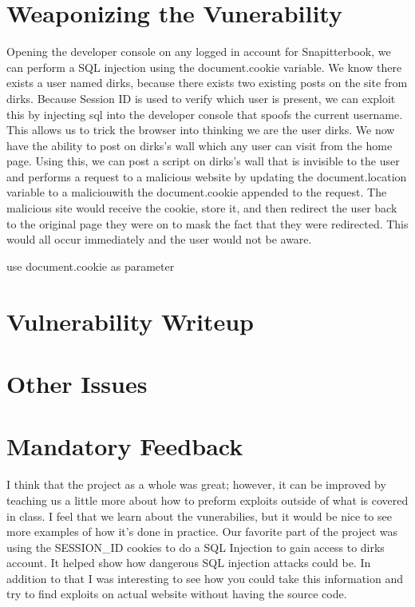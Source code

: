\documentclass[12pt]{article}
\begin{document}
\maketitle

\section{Weaponizing the Vunerability}
Opening the developer console on any logged in account for Snapitterbook, we can perform a SQL injection using the document.cookie variable.  We know there exists a user named dirks, because there exists two existing posts on the site from dirks.  Because Session ID is used to verify which user is present, we can exploit this by injecting sql into the developer console that spoofs the current username.  This allows us to trick the browser into thinking we are the user dirks.  We now have the ability to post on dirks's wall which any user can visit from the home page.  Using this, we can post a script on dirks's wall that is invisible to the user and performs a request to a malicious website by updating the document.location variable to a maliciouwith the document.cookie appended to the request.  The malicious site would receive the cookie, store it, and then redirect the user back to the original page they were on to mask the fact that they were redirected.  This would all occur immediately and the user would not be aware.

use document.cookie as parameter
\section{Vulnerability Writeup}

\section{Other Issues}

\section{Mandatory Feedback}
I think that the project as a whole was great; however, it can be improved by teaching us a little more about how to preform exploits outside of what is covered in class. I feel that we learn about the vunerabilies, but it would be nice to see more examples of how it's done in practice. Our favorite part of the project was using the SESSION\_ID cookies to do a SQL Injection to gain access to dirks account. It helped show how dangerous SQL injection attacks could be. In addition to that I was interesting to see how you could take this information and try to find exploits on actual website without having the source code.
\end{document}
